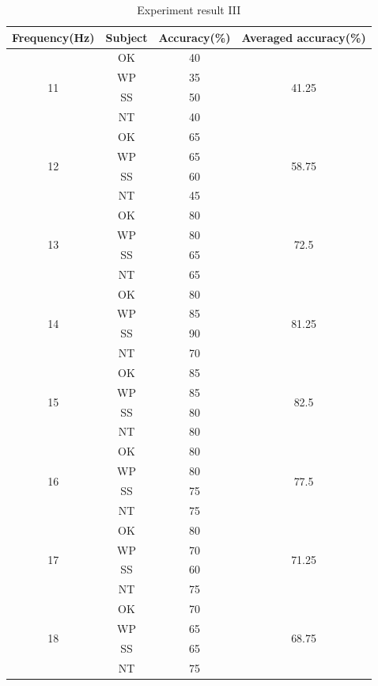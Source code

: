 \begin{table}[ht]
\begin{tabular}{| c | c | c | c |}
			\hline 
 			\textbf{Frequency(Hz)}&
 			\textbf{Subject}&
 			\textbf{Accuracy(\%)}&
 			\textbf{Averaged accuracy(\%)}\\
			\hline 
			\multirow{4}{*}{11}&OK&40&\multirow{4}{*}{41.25} \\
			\cline{2-3}
			&WP&35& \\ \cline{2-3}
			&SS&50& \\ \cline{2-3}
			&NT&40& \\
            \hline
			\multirow{4}{*}{12}&OK&65&\multirow{4}{*}{58.75} \\
			\cline{2-3}
			&WP&65& \\ \cline{2-3}
			&SS&60& \\ \cline{2-3}
			&NT&45& \\
            \hline
           \multirow{4}{*}{13}&OK&80&\multirow{4}{*}{72.5} \\
			\cline{2-3}
			&WP&80& \\ \cline{2-3}
			&SS&65& \\ \cline{2-3}
			&NT&65& \\
            \hline
            \multirow{4}{*}{14}&OK&80&\multirow{4}{*}{81.25} \\
			\cline{2-3}
			&WP&85& \\ \cline{2-3}
			&SS&90& \\ \cline{2-3}
			&NT&70& \\
            \hline
            \multirow{4}{*}{15}&OK&85&\multirow{4}{*}{82.5} \\
			\cline{2-3}
			&WP&85& \\ \cline{2-3}
			&SS&80& \\ \cline{2-3}
			&NT&80& \\
            \hline
            \multirow{4}{*}{16}&OK&80&\multirow{4}{*}{77.5} \\
			\cline{2-3}
			&WP&80& \\ \cline{2-3}
			&SS&75& \\ \cline{2-3}
			&NT&75& \\
            \hline
            \multirow{4}{*}{17}&OK&80&\multirow{4}{*}{71.25} \\
			\cline{2-3}
			&WP&70& \\ \cline{2-3}
			&SS&60& \\ \cline{2-3}
			&NT&75& \\
            \hline
            \multirow{4}{*}{18}&OK&70&\multirow{4}{*}{68.75} \\
			\cline{2-3}
			&WP&65& \\ \cline{2-3}
			&SS&65& \\ \cline{2-3}
			&NT&75& \\
            \hline
    \end{tabular}
\caption{Experiment result III}
\label{table:result3}
\end{table}

